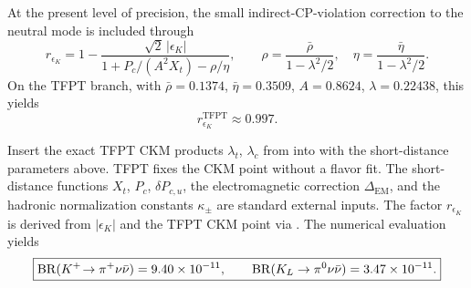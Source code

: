 At the present level of precision, the small indirect-CP-violation
correction to the neutral mode is included through \cite{BrodGorbahnStamou}
\begin{equation}
\label{eq:r-epsilon-K}
r_{\epsilon_K}
=
1
-\frac{\sqrt{2}\,|\epsilon_K|}
{1+P_c/(A^2 X_t)-\rho/\eta},
\qquad
\rho=\frac{\bar\rho}{1-\lambda^2/2},
\quad
\eta=\frac{\bar\eta}{1-\lambda^2/2}.
\end{equation}
On the TFPT branch, with $\bar\rho=0.1374$, $\bar\eta=0.3509$,
$A=0.8624$, $\lambda=0.22438$, this yields
\begin{equation}
\label{eq:r-epsilon-K-value}
r_{\epsilon_K}^{\mathrm{TFPT}}\approx 0.997.
\end{equation}

\begin{tcolorbox}[colback=blue!3, colframe=blue!50!black, breakable,
    title={\textbf{TFPT-fixed rare kaon prediction}}, fonttitle=\bfseries]
\begin{proposition}
\label{prop:br-prediction}
Insert the exact TFPT CKM products $\lambda_t$, $\lambda_c$ from
 into
 with the short-distance parameters above.
TFPT fixes the CKM point without a flavor fit.
The short-distance functions $X_t$, $P_c$, $\delta P_{c,u}$, the
electromagnetic correction $\Delta_{\mathrm{EM}}$, and the hadronic
normalization constants $\kappa_\pm$ are standard external inputs.
The factor $r_{\epsilon_K}$ is derived from $|\epsilon_K|$ and the
TFPT CKM point via .
The numerical evaluation yields
\begin{equation}
\label{eq:br-values}
\boxed{
\mathrm{BR}(K^+\!\to\pi^+\nu\bar\nu)
=
\num{9.40e-11},
\qquad
\mathrm{BR}(K_L\to\pi^0\nu\bar\nu)
=
\num{3.47e-11}.
}
\end{equation}
\end{proposition}
\end{tcolorbox}

